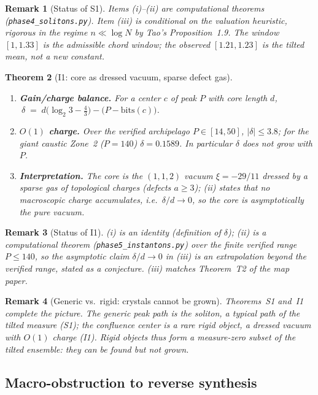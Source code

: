 \documentclass[12pt,a4paper]{article}
\newtheorem{theorem}{Theorem}[section]
\newtheorem{remark}[theorem]{Remark}
\begin{document}
\begin{remark}[Status of S1]
Items (i)--(ii) are computational theorems (\texttt{phase4\_solitons.py}). Item (iii)
is conditional on the valuation heuristic, rigorous in the regime $n\ll\log N$ by
Tao's Proposition~1.9. The window $[1,1.33]$ is the admissible chord window; the
observed $[1.21,1.23]$ is the tilted mean, not a new constant.
\end{remark}

\begin{theorem}[I1: core as dressed vacuum, sparse defect gas]
\label{thm:I1}
\begin{enumerate}
\item[(i)] \textbf{Gain/charge balance.} For a center $c$ of peak $P$ with core length
$d$, $\ \delta \;=\; d\big(\log_2 3-\tfrac43\big)-\big(P-\mathrm{bits}(c)\big)$.
\item[(ii)] \textbf{$O(1)$ charge.} Over the verified archipelago $P\in[14,50]$,
$|\delta|\le3.8$; for the giant caustic Zone~2 ($P=140$) $\delta=0.1589$.
In particular $\delta$ does not grow with $P$.
\item[(iii)] \textbf{Interpretation.} The core is the $(1,1,2)$ vacuum
$\xi=-29/11$ dressed by a sparse gas of topological charges (defects $a\ge3$);
(ii) states that no macroscopic charge accumulates, i.e.\ $\delta/d\to0$, so the
core is asymptotically the pure vacuum.
\end{enumerate}
\end{theorem}

\begin{remark}[Status of I1]
(i) is an identity (definition of $\delta$); (ii) is a computational theorem
(\texttt{phase5\_instantons.py}) over the finite verified range $P\le140$, so the
asymptotic claim $\delta/d\to0$ in (iii) is an extrapolation beyond the verified
range, stated as a conjecture. (iii) matches Theorem~T2 of the map paper.
\end{remark}

\begin{remark}[Generic vs.\ rigid: crystals cannot be grown]
Theorems~S1 and~I1 complete the picture. The \emph{generic} peak path is the
soliton, a typical path of the tilted measure (S1); the confluence center is a
\emph{rare rigid} object, a dressed vacuum with $O(1)$ charge (I1). Rigid objects
thus form a measure-zero subset of the tilted ensemble: they can be found but not
grown.
\end{remark}

\subsection{Macro-obstruction to reverse synthesis}
\end{document}
